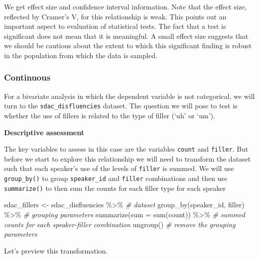 \documentclass[
]{article}
\newenvironment{Shaded}{\begin{snugshade}}{\end{snugshade}}
\newcommand{\AttributeTok}[1]{\textcolor[rgb]{0.77,0.63,0.00}{#1}}
\newcommand{\CommentTok}[1]{\textcolor[rgb]{0.56,0.35,0.01}{\textit{#1}}}
\newcommand{\FunctionTok}[1]{\textcolor[rgb]{0.00,0.00,0.00}{#1}}
\newcommand{\NormalTok}[1]{#1}
\newcommand{\OtherTok}[1]{\textcolor[rgb]{0.56,0.35,0.01}{#1}}
\newcommand{\SpecialCharTok}[1]{\textcolor[rgb]{0.00,0.00,0.00}{#1}}
\begin{document}
We get effect size and confidence interval information. Note that the effect size, reflected by Cramer's V, for this relationship is weak. This points out an important aspect to evaluation of statistical tests. The fact that a test is significant does not mean that it is meaningful. A small effect size suggests that we should be cautious about the extent to which this significant finding is robust in the population from which the data is sampled.

\hypertarget{continuous-1}{%
\subsubsection{Continuous}\label{continuous-1}}

For a bivariate analysis in which the dependent variable is not categorical, we will turn to the \texttt{sdac\_disfluencies} dataset. The question we will pose to test is whether the use of fillers is related to the type of filler (`uh' or `um').

\textbf{Descriptive assessment}

The key variables to assess in this case are the variables \texttt{count} and \texttt{filler}. But before we start to explore this relationship we will need to transform the dataset such that each speaker's use of the levels of \texttt{filler} is summed. We will use \texttt{group\_by()} to group \texttt{speaker\_id} and \texttt{filler} combinations and then use \texttt{summarize()} to then sum the counts for each filler type for each speaker

\begin{Shaded}
\begin{Highlighting}[]
\NormalTok{sdac\_fillers }\OtherTok{\textless{}{-}} 
\NormalTok{  sdac\_disfluencies }\SpecialCharTok{\%\textgreater{}\%} \CommentTok{\# dataset}
  \FunctionTok{group\_by}\NormalTok{(speaker\_id, filler) }\SpecialCharTok{\%\textgreater{}\%} \CommentTok{\# grouping parameters}
  \FunctionTok{summarize}\NormalTok{(}\AttributeTok{sum =} \FunctionTok{sum}\NormalTok{(count)) }\SpecialCharTok{\%\textgreater{}\%} \CommentTok{\# summed counts for each speaker{-}filler combination}
  \FunctionTok{ungroup}\NormalTok{() }\CommentTok{\# remove the grouping parameters}
\end{Highlighting}
\end{Shaded}

Let's preview this transformation.
\end{document}
